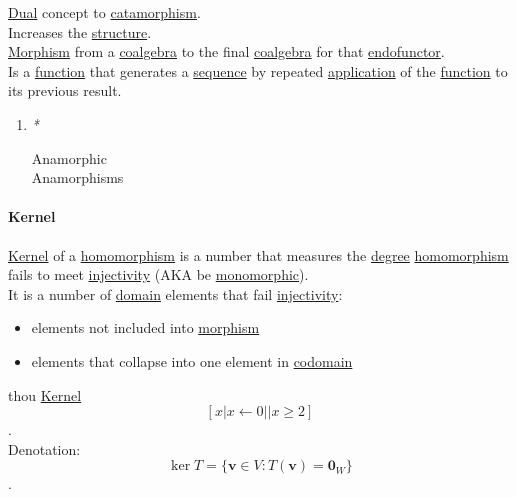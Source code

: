 \documentclass[11pt]{article}
\begin{document}
\hyperref[org28cefbe]{Dual} concept to \hyperref[orgefe2953]{catamorphism}.\\

Increases the \hyperref[org8051f61]{structure}.\\

\hyperref[org5de09d4]{Morphism} from a \hyperref[org4a1da7b]{coalgebra} to the final \hyperref[org4a1da7b]{coalgebra} for that \hyperref[orga4a1776]{endofunctor}.\\

Is a \hyperref[orge15bc14]{function} that generates a \hyperref[org522d1b0]{sequence} by repeated \hyperref[org2b89e66]{application} of the \hyperref[orge15bc14]{function} to its previous result.\\

\begin{enumerate}
\item \emph{*}
\label{sec:orgc87483c}

\label{org3ccd063}Anamorphic\\
\label{org53a62f0}Anamorphisms\\
\end{enumerate}

\paragraph{\label{org8fd3800}Kernel}
\label{sec:org4d08b8e}
\hyperref[org8fd3800]{Kernel} of a \hyperref[org4991058]{homomorphism} is a number that measures the \hyperref[orgd59f63d]{degree} \hyperref[org4991058]{homomorphism} fails to meet \hyperref[orge0ecd57]{injectivity} (AKA be \hyperref[orgc646917]{monomorphic}).\\
It is a number of \hyperref[org494b48a]{domain} elements that fail \hyperref[orge0ecd57]{injectivity}:\\
\begin{itemize}
\item elements not included into \hyperref[org5de09d4]{morphism}\\
\item elements that collapse into one element in \hyperref[org410079d]{codomain}\\
\end{itemize}
thou \hyperref[org8fd3800]{Kernel} $$ [ x | x \leftarrow 0 || x \ge 2 ] $$.\\

Denotation:\\
$$ \operatorname{ker}T = \{ \mathbf{v} \in V:T(\mathbf{v}) = \mathbf{0}_{W} \} $$.\\
\end{document}
